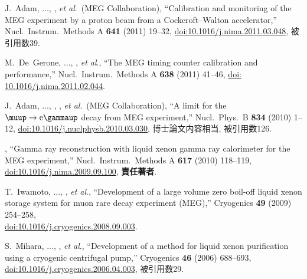 \begin{enumerate}
J.~Adam, ..., \me, {\it et al}.\ (MEG Collaboration),
``Calibration and monitoring of the MEG experiment by a proton beam from a Cockcroft--Walton accelerator,''
Nucl.\ Instrum.\ Methods A \textbf{641} (2011) 19--32,
\href{https://doi.org/10.1016/j.nima.2011.03.048}{doi:10.1016/j.nima.2011.03.048}, 被引用数39.

M.~De~Gerone, ..., \me, {\it et al}., %
``The MEG timing counter calibration and performance,''
Nucl.\ Instrum.\ Methods A \textbf{638} (2011) 41--46,
\href{https://doi.org/10.1016/j.nima.2011.02.044}{doi: 10.1016/j.nima.2011.02.044}.

J.~Adam, ..., \me, ,  {\it et al}.\ (MEG Collaboration),
``A limit for the $\meg$ decay from MEG experiment,''
Nucl.\ Phys.\ B \textbf{834} (2010) 1--12,
\href{https://doi.org/10.1016/j.nuclphysb.2010.03.030}{doi:10.1016/j.nuclphysb.2010.03.030},
博士論文内容相当, 被引用数126.

\me, ``Gamma ray reconstruction with liquid xenon gamma ray calorimeter for the MEG experiment,''
Nucl.\ Instrum.\ Methods A \textbf{617} (2010) 118--119,
\href{https://doi.org/10.1016/j.nima.2009.09.100}{doi:10.1016/j.nima.2009.09.100},
\textbf{責任著者}.

T.~Iwamoto, ..., \me,  {\it et al}.,  %
``Development of a large volume zero boil-off liquid xenon storage system for muon rare decay experiment (MEG),''
Cryogenics \textbf{49} (2009) 254--258,\\
\href{https://doi.org/10.1016/j.cryogenics.2008.09.003}{doi:10.1016/j.cryogenics.2008.09.003}.

S.~Mihara, ..., \me,  {\it et al}., %
``Development of a method for liquid xenon purification using a cryogenic centrifugal pump,''
Cryogenics \textbf{46} (2006) 688--693,
\href{https://doi.org/10.1016/j.cryogenics.2006.04.003}{doi:10.1016/j.cryogenics.2006.04.003}, 被引用数29.

\end{enumerate}



